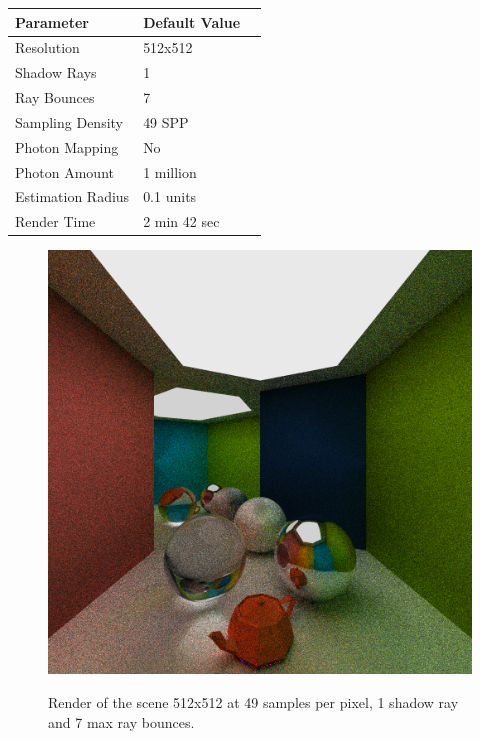 \documentclass[a4paper, twocolumn]{article}
\begin{document}
            \begin{table}[H]
            \centering
            \begin{tabular}{lll}
                \toprule
                \textbf{Parameter}&\textbf{Default Value}\\
                \midrule
                Resolution&512x512\\
                Shadow Rays&1\\
                Ray Bounces&7\\
                Sampling Density&49 SPP\\
                Photon Mapping&No\\
                Photon Amount&1 million\\
                Estimation Radius &0.1 units\\
                Render Time &2 min 42 sec\\
                \bottomrule
            \end{tabular}
            \label{tab:shadow_rays}
            \end{table}

            \begin{figure}[H]
                \centering
                \caption{Render of the scene 512x512 at 49 samples per pixel, 1 shadow ray and 7 max ray bounces.}
                \includegraphics[width=0.8\linewidth]{share/results/default.png}
                \label{fig:default}
            \end{figure}
\end{document}
